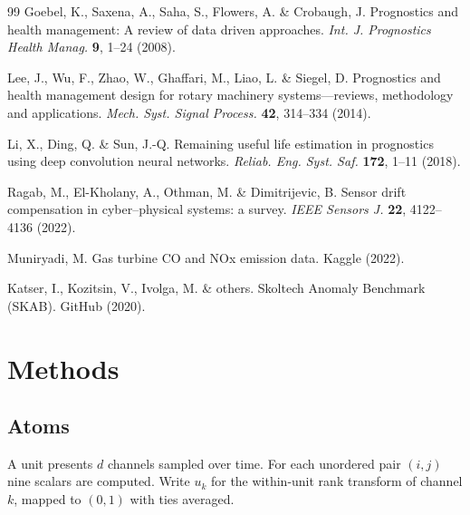 \documentclass[11pt]{article}
\begin{document}
\begin{thebibliography}{99}
 Goebel, K., Saxena, A., Saha, S., Flowers, A. \&
Crobaugh, J. Prognostics and health management: A review of data driven
approaches. \emph{Int. J. Prognostics Health Manag.} \textbf{9}, 1--24
(2008).

 Lee, J., Wu, F., Zhao, W., Ghaffari, M., Liao, L. \&
Siegel, D. Prognostics and health management design for rotary machinery
systems---reviews, methodology and applications. \emph{Mech. Syst. Signal
Process.} \textbf{42}, 314--334 (2014).

 Li, X., Ding, Q. \& Sun, J.-Q. Remaining useful
life estimation in prognostics using deep convolution neural networks.
\emph{Reliab. Eng. Syst. Saf.} \textbf{172}, 1--11 (2018).

 Ragab, M., El-Kholany, A., Othman, M. \& Dimitrijevic,
B. Sensor drift compensation in cyber--physical systems: a survey.
\emph{IEEE Sensors J.} \textbf{22}, 4122--4136 (2022).

 Muniryadi, M. Gas turbine CO and NOx emission data.
Kaggle (2022).

 Katser, I., Kozitsin, V., Ivolga, M. \& others. Skoltech
Anomaly Benchmark (SKAB). GitHub (2020).

\end{thebibliography}

\section{Methods}

\subsection{Atoms}

A unit presents $d$ channels sampled over time. For each unordered pair
$(i,j)$ nine scalars are computed. Write $u_k$ for the within-unit rank transform
of channel $k$, mapped to $(0,1)$ with ties averaged.
\end{document}
